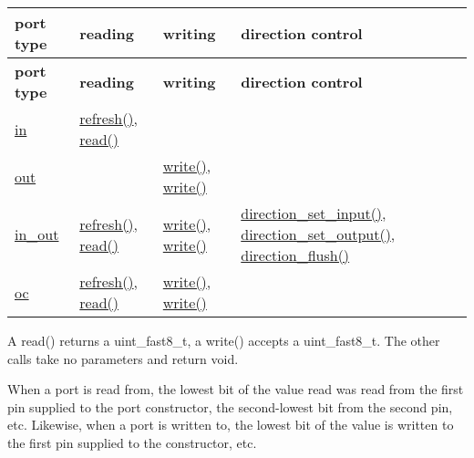 \tabulinesep=1mm
\begin{longtabu} spread 0pt [c]{*{4}{|X[-1]}|}
\hline
\rowcolor{\tableheadbgcolor}\textbf{ port type }&\textbf{ reading }&\textbf{ writing }&\textbf{ direction control  }\\
\endfirsthead
\hline
\endfoot
\hline
\rowcolor{\tableheadbgcolor}\textbf{ port type }&\textbf{ reading }&\textbf{ writing }&\textbf{ direction control  }\\
\endhead
\hyperlink{classhwlib_1_1port__in}{in} &\hyperlink{classhwlib_1_1port__in_a5d409eee35b766c844f7229fbe010545}{refresh()}, \hyperlink{classhwlib_1_1port__in_aa3aa277f9448c3ee493c56f05beb2ddb}{read()} &&\\
\hyperlink{classhwlib_1_1port__out}{out} &&\hyperlink{classhwlib_1_1port__out_a3644bf484ebe059ec5bf17fa43e0c01b}{write()}, \hyperlink{classhwlib_1_1port__out_a3644bf484ebe059ec5bf17fa43e0c01b}{write()} &\\
\hyperlink{classhwlib_1_1port__in__out}{in\+\_\+out} &\hyperlink{classhwlib_1_1port__in_a5d409eee35b766c844f7229fbe010545}{refresh()}, \hyperlink{classhwlib_1_1port__in_aa3aa277f9448c3ee493c56f05beb2ddb}{read()} &\hyperlink{classhwlib_1_1port__out_a3644bf484ebe059ec5bf17fa43e0c01b}{write()}, \hyperlink{classhwlib_1_1port__out_a3644bf484ebe059ec5bf17fa43e0c01b}{write()} &\hyperlink{classhwlib_1_1port__in__out_ac7a9611410ddb9fd5d8e2dd15bff0a3f}{direction\+\_\+set\+\_\+input()}, \hyperlink{classhwlib_1_1port__in__out_a515b4a6bbde4f2df5bb11cda41234fe4}{direction\+\_\+set\+\_\+output()}, \hyperlink{classhwlib_1_1port__in__out_a431b79eee48a21a93978bfdf6620f800}{direction\+\_\+flush()} \\
\hyperlink{classhwlib_1_1port__oc}{oc} &\hyperlink{classhwlib_1_1port__in_a5d409eee35b766c844f7229fbe010545}{refresh()}, \hyperlink{classhwlib_1_1port__in_aa3aa277f9448c3ee493c56f05beb2ddb}{read()} &\hyperlink{classhwlib_1_1port__out_a3644bf484ebe059ec5bf17fa43e0c01b}{write()}, \hyperlink{classhwlib_1_1port__out_a3644bf484ebe059ec5bf17fa43e0c01b}{write()} &\\
\end{longtabu}
A read() returns a uint\+\_\+fast8\+\_\+t, a write() accepts a uint\+\_\+fast8\+\_\+t. The other calls take no parameters and return void.

When a port is read from, the lowest bit of the value read was read from the first pin supplied to the port constructor, the second-\/lowest bit from the second pin, etc. Likewise, when a port is written to, the lowest bit of the value is written to the first pin supplied to the constructor, etc.


